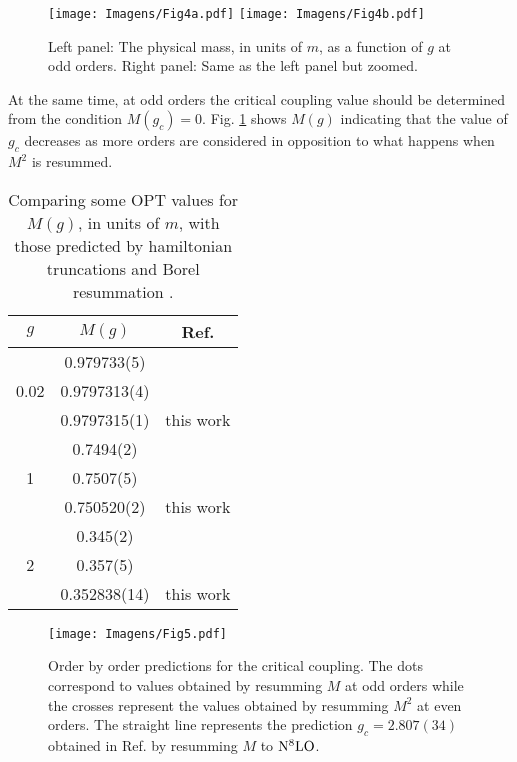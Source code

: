 \documentclass[a4paper,11pt]{article}
\begin{document}
\begin{figure}[ht!]
    \centering
    \texttt{[image: Imagens/Fig4a.pdf]}
    \qquad
     \texttt{[image: Imagens/Fig4b.pdf]}
    \caption{Left panel: The  physical mass, in units of $m$,  as a function of $g$ at odd orders. Right panel: Same as the left panel but zoomed.}
    \label{Fig4}
\end{figure}
At the same time, at odd orders the critical coupling value should be determined from the condition $M(g_c)=0$.  Fig. \ref{Fig4} shows $M(g)$  indicating that the value of $g_c$ decreases as more orders are considered in  opposition to what happens when $M^2$ is resummed. 
\begin{table}[ht!]
    \centering
    \begin{tabular}{ |c||c||c| }
        \hline
        $g$ & $M(g)$ &  Ref. \\
        \hline
        \hline
        {} &0.979733(5) & \cite{hamilton6,hamilton7}  \\ 
        0.02 &0.9797313(4) & \cite{serone1} \\
        {} &0.9797315(1) &  this work \\
        \hline
         {} &0.7494(2)& \cite{hamilton6,hamilton7}  \\ 
        1 &0.7507(5) & \cite{serone1} \\
        {} &0.750520(2) &  this work \\
        \hline
        {} &0.345(2) & \cite{hamilton6,hamilton7}  \\ 
        2 &0.357(5) & \cite{serone1} \\
        {} &0.352838(14) & this work \\
        \hline
    \end{tabular}
    \caption{Comparing some OPT values for $M(g)$, in units of $m$, with those predicted by hamiltonian truncations \cite {hamilton6,hamilton7} and Borel resummation \cite{serone1}.  }
\label{tabela1}    
\end{table}

 
\begin{figure}[ht!]
    \centering
    \texttt{[image: Imagens/Fig5.pdf]}
    \caption{Order by order predictions for the critical coupling. The dots correspond to values obtained by resumming $M$ at odd orders while the crosses represent the values obtained by resumming $M^2$ at even  orders. The straight line represents the prediction  $g_c = 2.807(34)$ obtained in Ref. \cite {serone1} by resumming $M$ to ${\rm N}^8{\rm LO}$. }
    \label{Fig5}
 \end{figure}   
    
\end{document}
